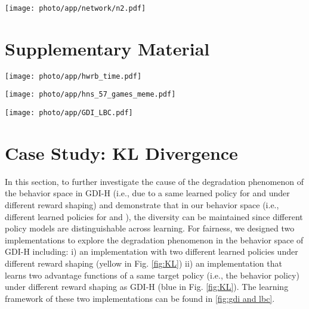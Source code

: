 \begin{figure*}[!ht]
	\centering
\texttt{[image: photo/app/network/n2.pdf]}
	\centering
\caption{Model Architecture of our main algorithm.}
\label{fig:lbc model}
\end{figure*}


\clearpage


\section{Supplementary Material}
\label{app: Supplementary Material}


\begin{figure*}[!ht]
	\centering
\texttt{[image: photo/app/hwrb\_time.pdf]}
	\centering
\caption{Human World Records Breakthrough of Atari RL Benchmarks.}
\label{fig:hwrb benchmark}
\end{figure*}



\begin{figure*}[!ht]
	\centering
\texttt{[image: photo/app/hns\_57\_games\_meme.pdf]}
	\centering
\caption{Performance Comparison between MEME and LBC based on HNS.(log scale)}
\label{fig:performance meme and lbc}
\end{figure*}








\begin{figure*}[!ht]
	\centering
\texttt{[image: photo/app/GDI\_LBC.pdf]}
	\centering
\caption{Different Learning Framework of GDI-H and LBC}
\label{fig:gdi and lbc}
\end{figure*}


\clearpage

\section{Case Study: KL Divergence}
\label{sec: KL Divergence Between policy models}


In this section, to further investigate the cause of the degradation phenomenon of the behavior space in GDI-H (i.e., due to a same learned policy  for  and  under different reward shaping) and demonstrate that in our behavior space (i.e., different learned policies for  and ), the diversity can be maintained since different policy models  are distinguishable across learning. For fairness, we designed two implementations to explore the degradation phenomenon in the behavior space of GDI-H including: i) an implementation  with two different learned policies under different reward shaping (yellow in Fig. \ref{fig:KL}) ii) an implementation that learns two advantage functions of a same target policy (i.e., the behavior policy) under different reward shaping as GDI-H (blue in Fig. \ref{fig:KL}). The learning framework of these two implementations can be found in \ref{fig:gdi and lbc}. 

